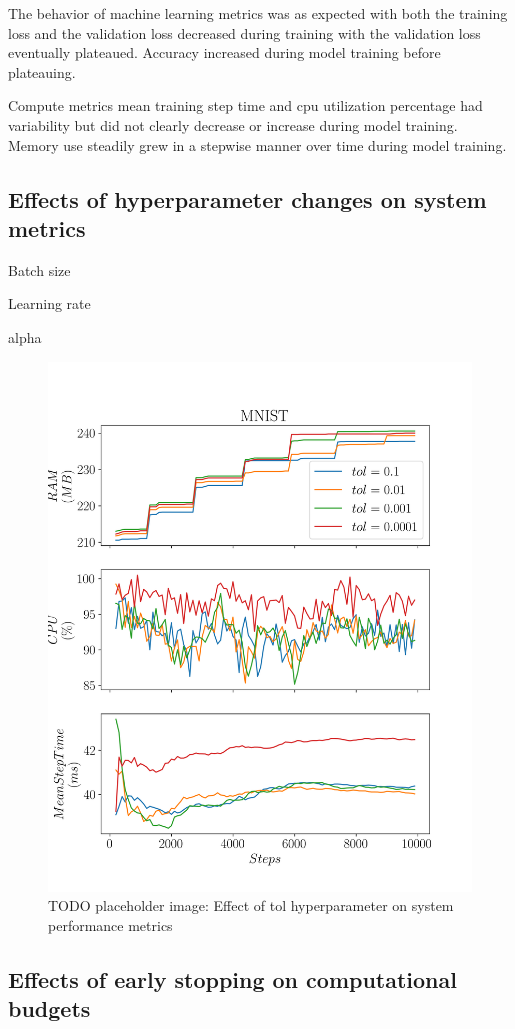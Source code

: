 The behavior of machine learning metrics was as expected with both the training loss and the validation loss decreased during training with the validation loss eventually plateaued. Accuracy increased during model training before plateauing.   

Compute metrics mean training step time and cpu utilization percentage had variability but did not clearly decrease or increase during model training.  Memory use steadily grew in a stepwise manner over time during model training.  


\subsection{Effects of hyperparameter changes on system metrics}

Batch size

Learning rate

alpha


\begin{figure}[h]
    \includegraphics[width=12cm]{assets/tol.png}
    \caption{TODO placeholder image: Effect of tol hyperparameter on system performance metrics}
    \label{figure:tol}
\end{figure}

\subsection{Effects of early stopping on computational budgets}




